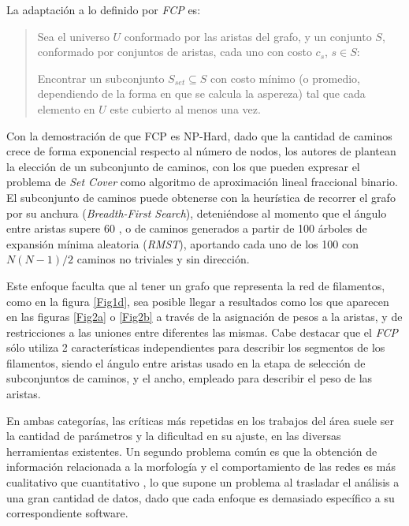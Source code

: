 \documentclass{article}
\begin{document}
La adaptaci\'on a lo definido por {\it FCP} es: 
\begin{quote}
Sea el universo $U$ conformado por las aristas del grafo, y un conjunto $S$, conformado por conjuntos de aristas, cada uno con costo $c_s$, $s \in S$:

Encontrar un subconjunto $S_{set} \subseteq S$ con costo m\'inimo (o promedio, dependiendo de la forma en que se calcula la aspereza) tal que cada elemento en $U$ este cubierto al menos una vez.
\end{quote}

Con la demostraci\'on de que FCP es NP-Hard, dado que la cantidad de caminos crece de forma exponencial respecto al n\'umero de nodos, los autores de \cite{breuer2015define} plantean la elecci\'on de un subconjunto de caminos, con los que pueden expresar el problema de {\it Set Cover} como algoritmo de aproximaci\'on lineal fraccional binario. El subconjunto de caminos puede obtenerse con la heur\'istica de recorrer el grafo por su anchura ({\it Breadth-First Search}), deteni\'endose al momento que el \'angulo entre aristas supere 60 \degree, o de caminos generados a partir de 100 \'arboles de expansi\'on m\'inima aleatoria ({\it RMST}), aportando cada uno de los 100 con $N(N-1)/2$ caminos no triviales y sin direcci\'on. 

Este enfoque faculta que al tener un grafo que representa la red de filamentos, como en la figura \ref{Fig1d}, sea posible llegar a resultados como los que aparecen en las figuras \ref{Fig2a} o \ref{Fig2b} a trav\'es de la asignaci\'on de pesos a la aristas, y de restricciones a las uniones entre diferentes las mismas. Cabe destacar que el {\it FCP} s\'olo utiliza 2 caracter\'isticas independientes para describir los segmentos de los filamentos, siendo el \'angulo entre aristas usado en la etapa de selecci\'on de subconjuntos de caminos, y el ancho, empleado para describir el peso de las aristas.  

En ambas categor\'ias, las cr\'iticas m\'as repetidas en los trabajos del \'area suele ser la cantidad de par\'ametros y la dificultad en su ajuste, en las diversas herramientas existentes. Un segundo problema com\'un es que la obtenci\'on de informaci\'on relacionada a la morfolog\'ia y el comportamiento de las redes es m\'as cualitativo que cuantitativo \cite{asgharzadeh2018computational}\cite{qiu2014quantitative}, lo que supone un problema al trasladar el  an\'alisis a una gran cantidad de datos, dado que cada enfoque es demasiado espec\'ifico a su correspondiente software.
\end{document}
